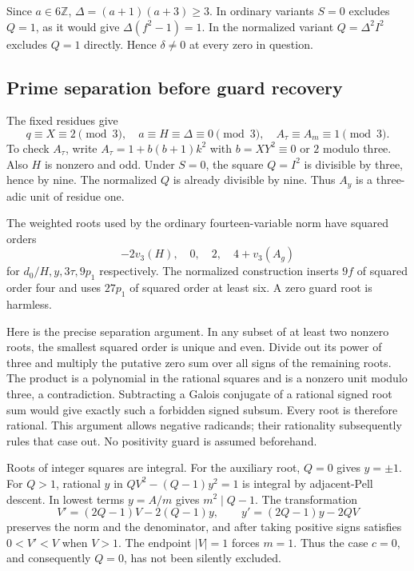 \documentclass[11pt]{article}
\begin{document}
Since $a\in6\mathbb Z$, $\Delta=(a+1)(a+3)\ge3$.
In ordinary variants $S=0$ excludes $Q=1$, as it would give
$\Delta(f^2-1)=1$. In the normalized variant $Q=\Delta^2I^2$ excludes
$Q=1$ directly. Hence $\delta\ne0$ at every zero in question.

\subsection{Prime separation before guard recovery}
The fixed residues give
\[
 q\equiv X\equiv2\pmod3,\quad a\equiv H\equiv\Delta\equiv0\pmod3,
 \quad A_\tau\equiv A_m\equiv1\pmod3.
\]
To check $A_\tau$, write $A_\tau=1+b(b+1)k^2$ with
$b=XY^2\equiv0$ or $2$ modulo three.
Also $H$ is nonzero and odd. Under $S=0$, the square $Q=I^2$ is divisible
by three, hence by nine. The normalized $Q$ is already divisible by nine.
Thus $A_y$ is a three-adic unit of residue one.

The weighted roots used by the ordinary fourteen-variable norm have
squared orders
\[
 -2v_3(H),\quad0,\quad2,\quad4+v_3(A_g)
\]
for $d_0/H,y,3\tau,9p_1$ respectively. The normalized construction
inserts $9f$ of squared order four and uses $27p_1$ of squared order
at least six. A zero guard root is harmless.

Here is the precise separation argument. In any subset of at least two
nonzero roots, the smallest squared order is unique and even. Divide
out its power of three and multiply the putative zero sum over all signs
of the remaining roots. The product is a polynomial in the rational
squares and is a nonzero unit modulo three, a contradiction.
Subtracting a Galois conjugate of a rational signed root sum would give
exactly such a forbidden signed subsum. Every root is therefore rational.
This argument allows negative radicands; their rationality subsequently
rules that case out. No positivity guard is assumed beforehand.

Roots of integer squares are integral. For the auxiliary root, $Q=0$
gives $y=\pm1$. For $Q>1$, rational $y$ in
$QV^2-(Q-1)y^2=1$ is integral by adjacent-Pell descent. In lowest terms
$y=A/m$ gives $m^2\mid Q-1$. The transformation
\[
 V'=(2Q-1)V-2(Q-1)y,\qquad
 y'=(2Q-1)y-2QV
\]
preserves the norm and the denominator, and after taking positive signs
satisfies $0<V'<V$ when $V>1$. The endpoint $|V|=1$ forces $m=1$.
Thus the case $c=0$, and consequently $Q=0$, has not been silently excluded.
\end{document}
